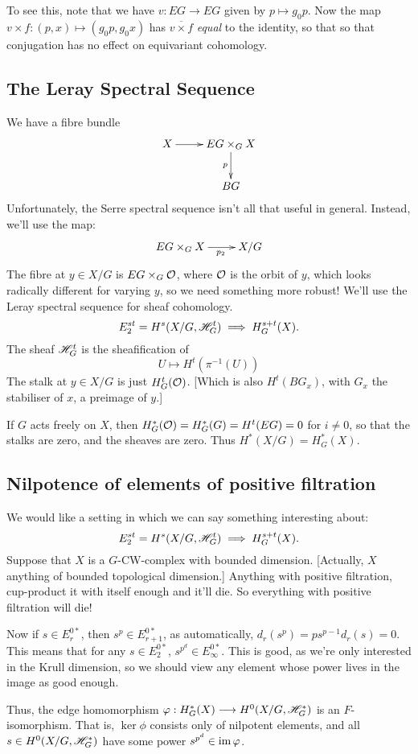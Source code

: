 \documentclass[11pt]{article}
\begin{document}
\begin{JeromyQuillen}
To see this, note that we have $v:EG\to EG$ given by $p\mapsto g_0p$. Now the map $v\times f:(p,x)\mapsto(g_0p,g_0x)$ has $\overline{v\times f}$ \emph{equal} to the identity, so that so that conjugation has no effect on equivariant cohomology.
\subsection*{The Leray Spectral Sequence}
We have a fibre bundle
\[\xymatrix{
X\ar[r]&EG\times_G X\ar[d]_p\\
&BG
}\]
Unfortunately, the Serre spectral sequence isn't all that useful in general. Instead, we'll use the map:
\[\xymatrix{
EG\times_G X\ar[r]_{\ \ \ p_2}&X/G
}\]
The fibre at $y\in X/G$ is $EG\times_G\mathcal{O}$, where $\mathcal{O}$ is the orbit of $y$, which looks radically different for varying $y$, so we need something more robust! We'll use the Leray spectral sequence for sheaf cohomology.
\[E_2^{st}=H^s(X/G,\mathscr{H}_G^t)\implies H_G^{s+t}(X).\]
The sheaf $\mathscr{H}_G^t$ is the sheafification of
\[U\mapsto H^t(\pi^{-1}(U))\]
The stalk at $y\in X/G$ is just $H^t_G(\mathcal{O})$. [Which is also $H^t(BG_x)$, with $G_x$ the stabiliser of $x$, a preimage of $y$.]
\begin{exmp*}
If $G$ acts freely on $X$, then $H_G^*(\mathcal{O})=H_G^*(G)=H^t(EG)=0$ for $i\neq0$, so that the stalks are zero, and the sheaves are zero. Thus $H^*(X/G)=H_G^*(X)$.
\end{exmp*}
\subsection*{Nilpotence of elements of positive filtration}
We would like a setting in which we can say something interesting about:
\[E_2^{st}=H^s(X/G,\mathscr{H}_G^t)\implies H_G^{s+t}(X).\]
Suppose that $X$ is a $G$-CW-complex with bounded dimension. [Actually, $X$ anything of bounded topological dimension.] Anything with positive filtration, cup-product it with itself enough and it'll die. So everything with positive filtration will die!

Now if $s\in E_r^{0*}$, then $s^p\in E_{r+1}^{0*}$, as automatically, $d_r(s^p)=ps^{p-1} d_r(s)=0$. This means that for any $s\in E_2^{0*}$, $s^{p^d}\in E_\infty^{0*}$. This is good, as we're only interested in the Krull dimension, so we should view any element whose power lives in the image as good enough.

Thus, the edge homomorphism $\varphi:H^*_G(X)\longrightarrow H^0(X/G,\mathscr{H}^*_G)$ is an $F$-isomorphism. That is, $\ker\phi$ consists only of nilpotent elements, and all $s\in H^0(X/G,\mathscr{H}^*_G)$ have some power $s^{p^d}\in\operatorname{im}\varphi$.


\end{JeromyQuillen}
\end{document}
